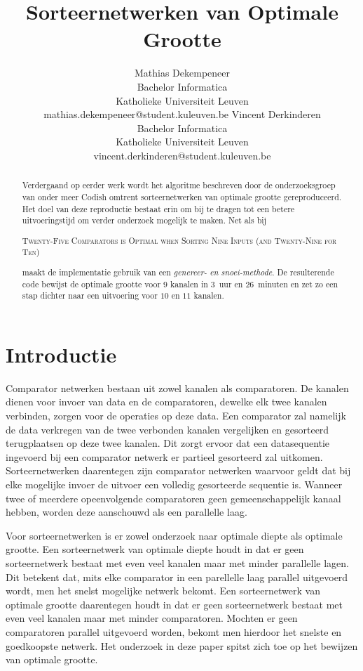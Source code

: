 \documentclass{article}
\title{Sorteernetwerken van Optimale Grootte}%
\author{Mathias Dekempeneer\\Bachelor Informatica\\Katholieke Universiteit Leuven \\mathias.dekempeneer@student.kuleuven.be
\And
Vincent Derkinderen\\Bachelor Informatica\\Katholieke Universiteit Leuven \\vincent.derkinderen@student.kuleuven.be}
\begin{document}
\maketitle

\begin{abstract}
Verdergaand op eerder werk wordt het algoritme beschreven door de onderzoeksgroep van onder meer Codish omtrent sorteernetwerken van optimale grootte gereproduceerd\cite{sortingNetworksSize2014}.
Het doel van deze reproductie bestaat erin om bij te dragen tot een betere uitvoeringstijd om verder onderzoek mogelijk te maken.
Net als bij
\begin{small}
\textsc{Twenty-Five Comparators is Optimal when Sorting Nine Inputs (and Twenty-Nine for Ten)}
\end{small}
maakt de implementatie gebruik van een \textit{genereer- en snoei-methode}.
De resulterende code bewijst de optimale grootte voor $9$ kanalen in $3$~uur en $26$~minuten en zet zo een stap dichter naar een uitvoering voor $10$ en $11$ kanalen.
\end{abstract}

\section{Introductie}
Comparator netwerken bestaan uit zowel kanalen als comparatoren.
De kanalen dienen voor invoer van data en de comparatoren, dewelke elk twee kanalen verbinden, zorgen voor de operaties op deze data.
Een comparator zal namelijk de data verkregen van de twee verbonden kanalen vergelijken en gesorteerd terugplaatsen op deze twee kanalen.
Dit zorgt ervoor dat een datasequentie ingevoerd bij een comparator netwerk er partieel gesorteerd zal uitkomen.
Sorteernetwerken daarentegen zijn comparator netwerken waarvoor geldt dat bij elke mogelijke invoer de uitvoer een volledig gesorteerde sequentie is.
Wanneer twee of meerdere opeenvolgende comparatoren geen gemeenschappelijk kanaal hebben, worden deze aanschouwd als een parallelle laag. 

Voor sorteernetwerken is er zowel onderzoek naar optimale diepte als optimale grootte.
Een sorteernetwerk van optimale diepte houdt in dat er geen sorteernetwerk bestaat met even veel kanalen maar met minder parallelle lagen.
Dit betekent dat, mits elke comparator in een parellelle laag parallel uitgevoerd wordt, men het snelst mogelijke netwerk bekomt.
Een sorteernetwerk van optimale grootte daarentegen houdt in dat er geen sorteernetwerk bestaat met even veel kanalen maar met minder comparatoren.
Mochten er geen comparatoren parallel uitgevoerd worden, bekomt men hierdoor het snelste en goedkoopste netwerk.
Het onderzoek in deze paper spitst zich toe op het bewijzen van optimale grootte.
\end{document}
